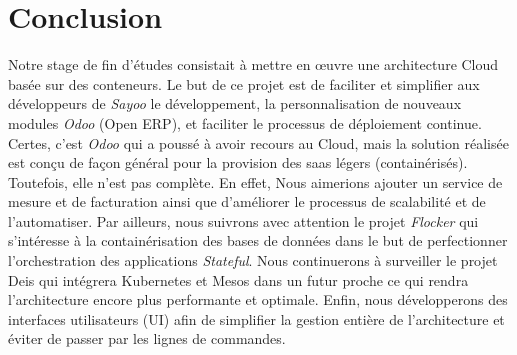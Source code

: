 \chapter*{Conclusion}

\begin{onehalfspace}
\initial
Notre stage de fin d'études consistait à mettre en œuvre une architecture Cloud basée sur des conteneurs. Le but de ce projet est de faciliter et simplifier aux développeurs de \emph{Sayoo} le développement, la personnalisation de nouveaux modules \emph{Odoo} (Open ERP), et faciliter le processus de déploiement continue.
\newline
\newline
Certes, c'est \emph{Odoo} qui a poussé à avoir recours au Cloud, mais la solution réalisée est conçu de façon général pour la provision des \acrshort{saas} légers (containérisés). Toutefois, elle n'est pas complète. En effet, Nous aimerions ajouter un service de mesure et de facturation ainsi que d'améliorer le processus de scalabilité et de l'automatiser.
\newline
\newline
\noindent Par ailleurs, nous suivrons avec attention le projet \emph{Flocker} qui s'intéresse à la containérisation des bases de données dans le but de perfectionner l'orchestration des applications \emph{Stateful}. Nous continuerons à surveiller le projet Deis qui intégrera Kubernetes et Mesos dans un futur proche ce qui rendra l'architecture encore plus performante et optimale. Enfin, nous développerons des interfaces utilisateurs (UI) afin de simplifier la gestion entière de l'architecture et éviter de passer par les lignes de commandes.  	
\newline
\newline
\end{onehalfspace}